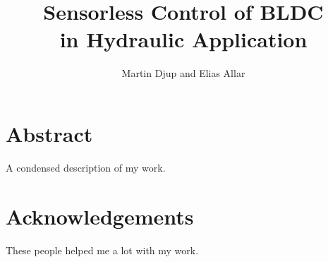 \documentclass{LTHthesis}
\begin{document}
\begin{titlepages}
\author{Martin Djup and Elias Allar}
\title{Sensorless Control of BLDC\\ in Hydraulic Application}
\end{titlepages}
\chapter*{Abstract}
A condensed description of my work.
\chapter*{Acknowledgements}
These people helped me a lot with my work.
\tableofcontents

%
%
%


%
\end{document}
